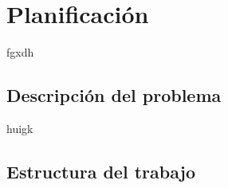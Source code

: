 \chapter{Planificación}\label{chap:Plan}

fgxdh

\section{Descripción del problema}

huigk

\section{Estructura del trabajo}



